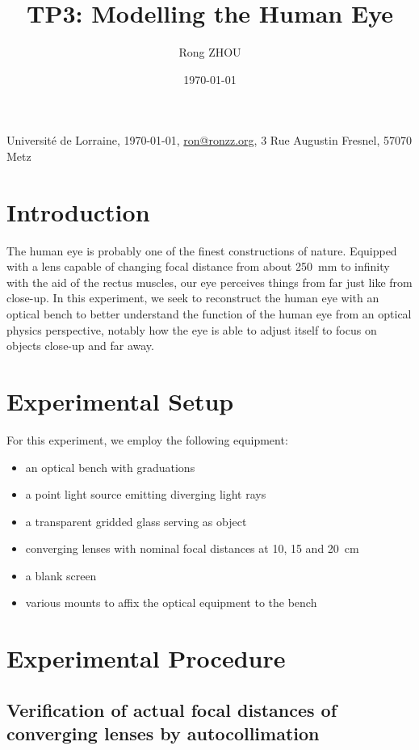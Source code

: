 \documentclass[a4paper,11pt]{article}
\title{TP3: Modelling the Human Eye}
\author{Rong ZHOU}
\date{\today}
\newcommand{\univaddress}{3 Rue Augustin Fresnel, 57070 Metz}
\begin{document}
\maketitle
\begin{center}
  \small Universit\'e de Lorraine, \today, \href{mailto:ron@ronzz.org}{ron@ronzz.org}, \univaddress
\end{center}

\section{Introduction}

The human eye is probably one of the finest constructions of nature. Equipped with a lens capable of changing focal distance from about 250~mm to infinity with the aid of the rectus muscles, our eye perceives things from far just like from close-up. In this experiment, we seek to reconstruct the human eye with an optical bench to better understand the function of the human eye from an optical physics perspective, notably how the eye is able to adjust itself to focus on objects close-up and far away.

\section{Experimental Setup}

For this experiment, we employ the following equipment:

\begin{itemize}
    \item an optical bench with graduations
    \item a point light source emitting diverging light rays
    \item a transparent gridded glass serving as object
    \item converging lenses with nominal focal distances at 10, 15 and 20~cm
    \item a blank screen
    \item various mounts to affix the optical equipment to the bench
\end{itemize}

\section{Experimental Procedure}

\subsection{Verification of actual focal distances of converging lenses by autocollimation}
\end{document}
